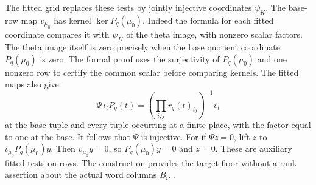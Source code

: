 The fitted grid replaces these tests by jointly injective coordinates
\(\psi_K\). The base-row map \(v_{\mu_0}\) has kernel
\(\ker P_q(\mu_0)\). Indeed the formula for each fitted coordinate
compares it with \(\psi_K\) of the theta image, with nonzero scalar
factors. The theta image itself is zero precisely when the base
quotient coordinate \(P_q(\mu_0)\) is zero. The formal proof uses the
surjectivity of \(P_q(\mu_0)\) and one nonzero row to certify the
common scalar before comparing kernels. The fitted maps also give
\[
 \Psi\,\iota_tP_q(t)=
          \left(\prod_{i,j}r_q(t)_{ij}\right)^{-1}v_t
\]
at the base tuple and every tuple occurring at a finite place, with
the factor equal to one at the base. It follows that \(\Psi\) is
injective. For if \(\Psi z=0\), lift \(z\) to
\(\iota_{\mu_0}P_q(\mu_0)y\). Then \(v_{\mu_0}y=0\), so
\(P_q(\mu_0)y=0\) and \(z=0\). These are auxiliary fitted tests on rows.
The construction provides the target floor without a rank assertion
about the actual word columns \(B_i\).
.

